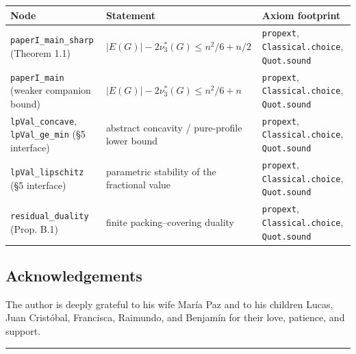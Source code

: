 \documentclass[
  american,
  11pt,
  a4paper,
]{article}
\newcounter{none} %
\begin{document}
{\def\LTcaptype{none} %
\begin{longtable}[]{@{}
  >{\raggedright\arraybackslash}p{}
  >{\raggedright\arraybackslash}p{}
  >{\raggedright\arraybackslash}p{}@{}}
\toprule\noalign{}
\begin{minipage}[b]{\linewidth}\raggedright
Node
\end{minipage} & \begin{minipage}[b]{\linewidth}\raggedright
Statement
\end{minipage} & \begin{minipage}[b]{\linewidth}\raggedright
Axiom footprint
\end{minipage} \\
\midrule\noalign{}
\endhead
\bottomrule\noalign{}
\endlastfoot
\texttt{paperI\_main\_sharp} (Theorem 1.1) & \(\lvert E(G)\rvert-2\nu_3^*(G)\le n^2/6+n/2\) & \texttt{propext}, \texttt{Classical.choice}, \texttt{Quot.sound} \\
\texttt{paperI\_main} (weaker companion bound) & \(\lvert E(G)\rvert-2\nu_3^*(G)\le n^2/6+n\) & \texttt{propext}, \texttt{Classical.choice}, \texttt{Quot.sound} \\
\texttt{lpVal\_concave}, \texttt{lpVal\_ge\_min} (§5 interface) & abstract concavity / pure-profile lower bound & \texttt{propext}, \texttt{Classical.choice}, \texttt{Quot.sound} \\
\texttt{lpVal\_lipschitz} (§5 interface) & parametric stability of the fractional value & \texttt{propext}, \texttt{Classical.choice}, \texttt{Quot.sound} \\
\texttt{residual\_duality} (Prop. B.1) & finite packing--covering duality & \texttt{propext}, \texttt{Classical.choice}, \texttt{Quot.sound} \\
\end{longtable}
}

\subsection{Acknowledgements}\label{acknowledgements}

The author is deeply grateful to his wife María Paz and to his children Lucas, Juan Cristóbal, Francisca, Raimundo, and Benjamín for their love, patience, and support.

\begin{center}\rule{0.5\linewidth}{0.5pt}\end{center}
\end{document}
